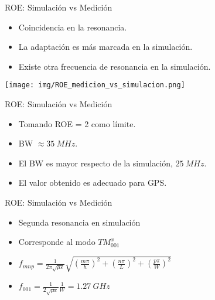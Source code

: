 \begin{frame}{ROE: Simulación vs Medición}

\begin{itemize}
    \item<2-> Coincidencia en la resonancia.
    \item<3-> La adaptación es más marcada en la simulación.
    \item<4-> Existe otra frecuencia de resonancia en la simulación.
\end{itemize}

\begin{center}
    \texttt{[image: img/ROE\_medicion\_vs\_simulacion.png]}
\end{center}
    
\end{frame}

\begin{frame}{ROE: Simulación vs Medición}

\begin{itemize}
    \item Tomando ROE = 2 como límite.
    \item BW $\approx 35 \ MHz$.
    \item El BW es mayor respecto de la simulación, $25 \ MHz$.
    \item El valor obtenido es adecuado para GPS.
\end{itemize}
\end{frame}

\begin{frame}{ROE: Simulación vs Medición}

\begin{itemize}
    \item Segunda resonancia en simulación
    \item Corresponde al modo $TM^{x}_{001}$
    \item $f_{mnp} = \frac{1}{2 \pi \sqrt{\mu \varepsilon}}\sqrt{\left( \frac{m \pi}{h} \right)^2 + \left( \frac{n \pi}{L} \right)^2 + \left( \frac{p \pi}{W} \right)^2 }$
    \item $f_{001} = \frac{1}{2 \sqrt{\mu \varepsilon}} \frac{1}{W} = 1.27 \ GHz$
\end{itemize}
\end{frame}


